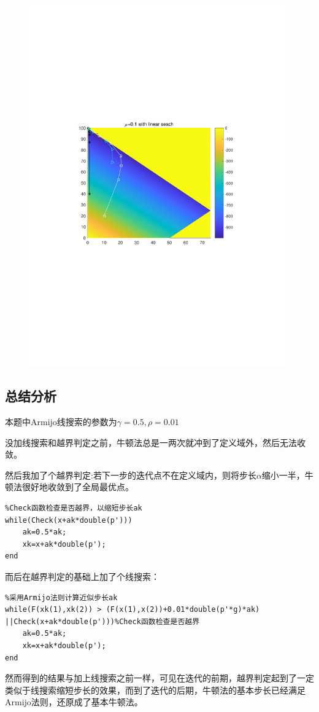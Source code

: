 \begin{figure}[H]
\centering
\includegraphics[width=11cm]{fig/3_2.pdf}
\end{figure}

\subsection{总结分析}
本题中Armijo线搜索的参数为$\gamma=0.5,\rho=0.01$

没加线搜索和越界判定之前，牛顿法总是一两次就冲到了定义域外，然后无法收敛。

然后我加了个越界判定:若下一步的迭代点不在定义域内，则将步长$\alpha$缩小一半，牛顿法很好地收敛到了全局最优点。

\begin{lstlisting}
%Check函数检查是否越界，以缩短步长ak
while(Check(x+ak*double(p')))
	ak=0.5*ak;
	xk=x+ak*double(p');
end
\end{lstlisting}

而后在越界判定的基础上加了个线搜索：

\begin{lstlisting}
%采用Armijo法则计算近似步长ak
while(F(xk(1),xk(2)) > (F(x(1),x(2))+0.01*double(p'*g)*ak)
||Check(x+ak*double(p')))%Check函数检查是否越界
	ak=0.5*ak;
	xk=x+ak*double(p');
end
\end{lstlisting}

然而得到的结果与加上线搜索之前一样，可见在迭代的前期，越界判定起到了一定类似于线搜索缩短步长的效果，而到了迭代的后期，牛顿法的基本步长已经满足Armijo法则，还原成了基本牛顿法。
